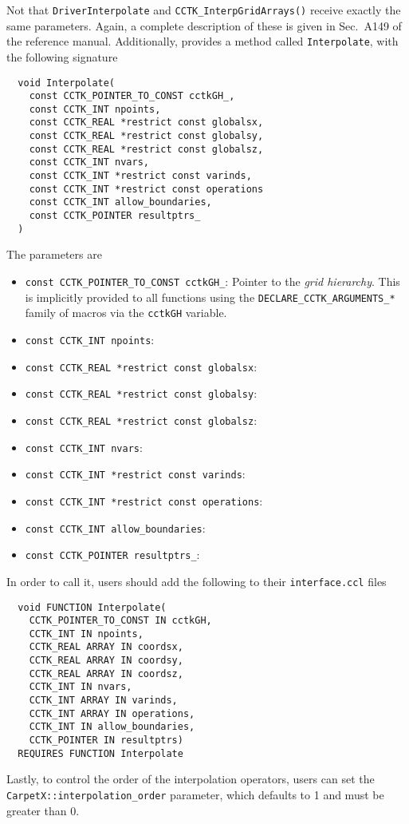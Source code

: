 Not that \texttt{DriverInterpolate} and \texttt{CCTK\_InterpGridArrays()} receive exactly the same parameters. Again, a complete description of these is given in Sec.~A149 of the \Cactus\space reference manual. Additionally, \CarpetX\space provides a method called \texttt{Interpolate}, with the following signature
%
\begin{lstlisting}
  void Interpolate(
    const CCTK_POINTER_TO_CONST cctkGH_,
    const CCTK_INT npoints,
    const CCTK_REAL *restrict const globalsx,
    const CCTK_REAL *restrict const globalsy,
    const CCTK_REAL *restrict const globalsz,
    const CCTK_INT nvars,
    const CCTK_INT *restrict const varinds,
    const CCTK_INT *restrict const operations
    const CCTK_INT allow_boundaries,
    const CCTK_POINTER resultptrs_
  )
\end{lstlisting}
%
The parameters are 
%
\begin{itemize}
  \item \texttt{const CCTK\_POINTER\_TO\_CONST cctkGH\_}: Pointer to the \Cactus\space \textit{grid hierarchy}. This is implicitly provided to all functions using the \texttt{DECLARE\_CCTK\_ARGUMENTS\_*} family of macros via the \texttt{cctkGH} variable.

  \item \texttt{const CCTK\_INT npoints}:
  \item \texttt{const CCTK\_REAL *restrict const globalsx}:
  \item \texttt{const CCTK\_REAL *restrict const globalsy}:
  \item \texttt{const CCTK\_REAL *restrict const globalsz}:
  \item \texttt{const CCTK\_INT nvars}:
  \item \texttt{const CCTK\_INT *restrict const varinds}:
  \item \texttt{const CCTK\_INT *restrict const operations}:
  \item \texttt{const CCTK\_INT allow\_boundaries}:
  \item \texttt{const CCTK\_POINTER resultptrs\_}:
\end{itemize}

In order to call it, users should add the following to their \texttt{interface.ccl} files
%
\begin{lstlisting}
  void FUNCTION Interpolate(
    CCTK_POINTER_TO_CONST IN cctkGH,
    CCTK_INT IN npoints,
    CCTK_REAL ARRAY IN coordsx,
    CCTK_REAL ARRAY IN coordsy,
    CCTK_REAL ARRAY IN coordsz,
    CCTK_INT IN nvars,
    CCTK_INT ARRAY IN varinds,
    CCTK_INT ARRAY IN operations,
    CCTK_INT IN allow_boundaries,
    CCTK_POINTER IN resultptrs)
  REQUIRES FUNCTION Interpolate
\end{lstlisting} 

Lastly, to control the order of the interpolation operators, users can set the \texttt{CarpetX::interpolation\_order} parameter, which defaults to 1 and must be greater than 0.
